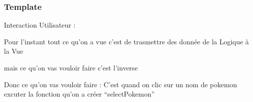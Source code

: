 \documentclass[10pt]{beamer}
\begin{document}
	\begin{frame}
		\frametitle{Template}

		Interaction Utilisateur : \newline \newline

		Pour l’instant tout ce qu’on a vue c’est de trasmettre des donnée de la \alert{Logique} à la \alert{Vue} \newline \newline

		mais ce qu’on vas vouloir faire c’est l’inverse \newline \newline


		Donc ce qu’on vas vouloir faire : \newline
		C’est quand on clic sur un nom de pokemon excuter la fonction qu’on a créer “selectPokemon” \newline \newline


	\end{frame}
\end{document}
